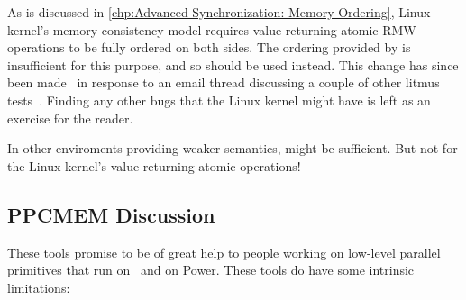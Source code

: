 \begin{fcvref}
{{	As is discussed in
	\cref{chp:Advanced Synchronization: Memory Ordering},
	Linux kernel's memory consistency model requires
	value-returning atomic RMW operations to be fully ordered
	on both sides.
	The ordering provided by  is insufficient for this
	purpose, and so  should be used instead.
	This change has since been
	made~\cite{BoqunFeng2015:powerpc:value-returning-atomics}
	in response to an email thread discussing a couple of other litmus
	tests~\cite{Paulmck2015:powerpc:value-returning-atomics}.
	Finding any other bugs that the Linux kernel might have is left
	as an exercise for the reader.

	In other enviroments providing weaker semantics, 
	might be sufficient.
	But not for the Linux kernel's value-returning atomic operations!
}\QuickQuizEndE
}

\subsection{PPCMEM Discussion}
\label{sec:formal:PPCMEM Discussion}

These tools promise to be of great help to people working on low-level
parallel primitives that run on \ARM\ and on Power. These tools do have
some intrinsic limitations:


\end{fcvref}
